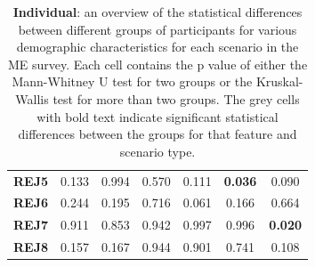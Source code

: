 \begin{table}
\begin{tabular}{lccc|ccc}
        \textbf{REJ5} & 0.133                                   & 0.994                                             & 0.570                                  & 0.111                                    & \cellcolor[HTML]{EFEFEF}\textbf{0.036} & 0.090                                  \\
        \textbf{REJ6} & 0.244                                   & 0.195                                             & 0.716                                  & 0.061                                    & 0.166                                  & 0.664                                  \\
        \textbf{REJ7} & 0.911                                   & 0.853                                             & 0.942                                  & 0.997                                    & 0.996                                  & \cellcolor[HTML]{EFEFEF}\textbf{0.020} \\
        \textbf{REJ8} & 0.157                                   & 0.167                                             & 0.944                                  & 0.901                                    & 0.741                                  & 0.108                                  \\
        \bottomrule
    \end{tabular}
    \caption{\textbf{Individual}: an overview of the statistical differences between different groups of participants for various demographic characteristics for each scenario in the ME survey. Each cell contains the p value of either the Mann-Whitney U test for two groups or the Kruskal-Wallis test for more than two groups. The grey cells with bold text indicate significant statistical differences between the groups for that feature and scenario type.}
    \label{tab:results-differences-ind}
\end{table}

